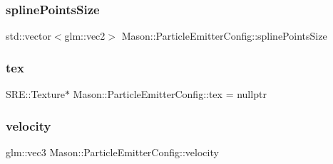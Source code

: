 \hypertarget{struct_mason_1_1_particle_emitter_config_ae379890e2a2de9c8f4dc1a391393f41a}{}\label{struct_mason_1_1_particle_emitter_config_ae379890e2a2de9c8f4dc1a391393f41a} 
\subsubsection{\texorpdfstring{spline\+Points\+Size}{splinePointsSize}}
{\footnotesize\ttfamily std\+::vector$<$glm\+::vec2$>$ Mason\+::\+Particle\+Emitter\+Config\+::spline\+Points\+Size}

\hypertarget{struct_mason_1_1_particle_emitter_config_a660e9a7613b158ac36bfc4ffe8b5f610}{}\label{struct_mason_1_1_particle_emitter_config_a660e9a7613b158ac36bfc4ffe8b5f610} 
\subsubsection{\texorpdfstring{tex}{tex}}
{\footnotesize\ttfamily S\+R\+E\+::\+Texture$\ast$ Mason\+::\+Particle\+Emitter\+Config\+::tex = nullptr}

\hypertarget{struct_mason_1_1_particle_emitter_config_af8c3efa305e0a0636576bebe60938c80}{}\label{struct_mason_1_1_particle_emitter_config_af8c3efa305e0a0636576bebe60938c80} 
\subsubsection{\texorpdfstring{velocity}{velocity}}
{\footnotesize\ttfamily glm\+::vec3 Mason\+::\+Particle\+Emitter\+Config\+::velocity}

\hypertarget{struct_mason_1_1_particle_emitter_config_a449a7ec64ad8d9f9be405f1beb5ee507}{}\label{struct_mason_1_1_particle_emitter_config_a449a7ec64ad8d9f9be405f1beb5ee507} 
